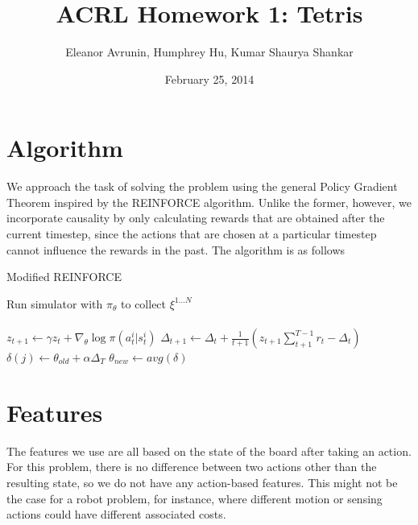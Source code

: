 \documentclass[11pt]{article}
\begin{document}
  

\title{ACRL Homework 1:  Tetris}
\date{February 25, 2014}
\author{Eleanor Avrunin, Humphrey Hu, Kumar Shaurya Shankar}

\maketitle

\section{Algorithm}
We approach the task of solving the problem using the general Policy Gradient Theorem inspired by the REINFORCE algorithm. Unlike the former, however, we incorporate causality by only calculating rewards that are obtained after the current timestep, since the actions that are chosen at a particular timestep cannot influence the rewards in the past. The algorithm is as follows

\begin{algorithm}
\caption{Modified REINFORCE}
\label{reinforce_alg}
\begin{algorithmic}
\STATE Run simulator with $\pi_{\theta}$ to collect $\xi^{1...N}$\\
\\
\STATE $z_{t+1} \gets \gamma z_t + \nabla_{\theta}\log\pi\left(a_{t}^{i}|s_{t}^{i} \right)$
\STATE $\Delta_{t+1} \gets \Delta_t + \frac{1}{t+1} \left( z_{t+1}\sum\limits_{t+1}^{T-1} r_t - \Delta_t\right)$
\ENDFOR
\STATE $\delta(j) \gets \theta_{old}+\alpha \Delta_T$
\ENDFOR
\STATE $\theta_{new} \gets  avg(\delta)$
\ENDFOR
\end{algorithmic}
\end{algorithm}


\section{Features}

The features we use are all based on the state of the board after taking an action.  For this problem, there is no difference between two actions other than the resulting state, so we do not have any action-based features.  This might not be the case for a robot problem, for instance, where different motion or sensing actions could have different associated costs.
\end{document}
